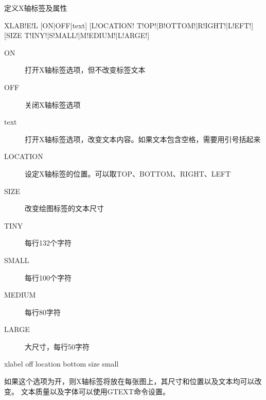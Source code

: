 \label{cmd:xlabel}

定义X轴标签及属性

\begin{SACSTX}
XLAB!E!L [ON|OFF|text] [L!OCATION! T!OP!|B!OTTOM!|R!IGHT!|L!EFT!] 
    [SIZE T!INY!|S!MALL!|M!EDIUM!|L!ARGE!]
\end{SACSTX}

\begin{description}
\item [ON] 打开X轴标签选项，但不改变标签文本
\item [OFF] 关闭X轴标签选项 
\item [text] 打开X轴标签选项，改变文本内容。如果文本包含空格，需要用引号括起来
\item [LOCATION] 设定X轴标签的位置。可以取TOP、BOTTOM、RIGHT、LEFT
\item [SIZE] 改变绘图标签的文本尺寸
\item [TINY] 每行132个字符
\item [SMALL] 每行100个字符 
\item [MEDIUM] 每行80字符 
\item [LARGE] 大尺寸，每行50字符 
\end{description}

\begin{SACDFT}
xlabel off location bottom size small
\end{SACDFT}

如果这个选项为开，则X轴标签将放在每张图上，其尺寸和位置以及文本均可以改变。
文本质量以及字体可以使用GTEXT命令设置。

